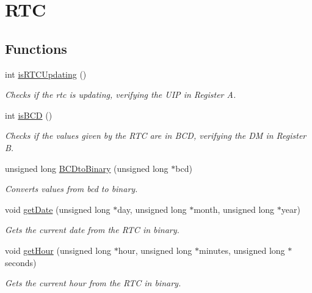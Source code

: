 \hypertarget{group___r_t_c}{}\section{R\+TC}
\label{group___r_t_c}
\subsection*{Functions}
\begin{DoxyCompactItemize}
\item 
int \hyperlink{group___r_t_c_gaa2b091a9cf7dce22b896bb1f041b3e2f}{is\+R\+T\+C\+Updating} ()
\begin{DoxyCompactList}\small\item\em Checks if the rtc is updating, verifying the U\+IP in Register A. \end{DoxyCompactList}\item 
int \hyperlink{group___r_t_c_gadc99d6e13380791f37d25254f382185b}{is\+B\+CD} ()
\begin{DoxyCompactList}\small\item\em Checks if the values given by the R\+TC are in B\+CD, verifying the DM in Register B. \end{DoxyCompactList}\item 
unsigned long \hyperlink{group___r_t_c_gac415cba00d3b076015e540f85de75b45}{B\+C\+Dto\+Binary} (unsigned long $\ast$bcd)
\begin{DoxyCompactList}\small\item\em Converts values from bcd to binary. \end{DoxyCompactList}\item 
void \hyperlink{group___r_t_c_ga151db8d516dd649f8d14dab18be79882}{get\+Date} (unsigned long $\ast$day, unsigned long $\ast$month, unsigned long $\ast$year)
\begin{DoxyCompactList}\small\item\em Gets the current date from the R\+TC in binary. \end{DoxyCompactList}\item 
void \hyperlink{group___r_t_c_ga87be9dbdb025ecbb1bd326713842f043}{get\+Hour} (unsigned long $\ast$hour, unsigned long $\ast$minutes, unsigned long $\ast$seconds)
\begin{DoxyCompactList}\small\item\em Gets the current hour from the R\+TC in binary. \end{DoxyCompactList}\end{DoxyCompactItemize}


